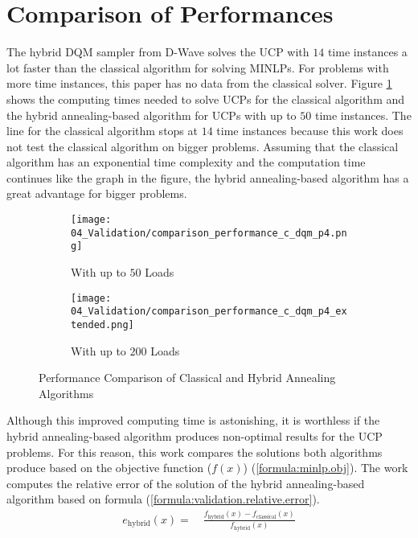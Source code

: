 \section{Comparison of Performances}
\label{evaluation:comparison}

The hybrid DQM sampler from D-Wave solves the UCP with $14$ time instances a lot faster than the classical algorithm for solving MINLPs.
For problems with more time instances, this paper has no data from the classical solver.
Figure \ref{figure:evaluation.comparison.performance} shows the computing times needed to solve UCPs for the classical algorithm and the hybrid annealing-based algorithm for UCPs with up to $50$ time instances.
The line for the classical algorithm stops at $14$ time instances because this work does not test the classical algorithm on bigger problems.
Assuming that the classical algorithm has an exponential time complexity and the computation time continues like the graph in the figure, the hybrid annealing-based algorithm has a great advantage for bigger problems.

\begin{figure}
  \begin{subfigure}[b]{0.5 \textwidth}
    \centering
    \texttt{[image: 04\_Validation/comparison\_performance\_c\_dqm\_p4.png]}
    \caption{With up to $50$ Loads}
    \label{figure:evaluation.comparison.performance}
  \end{subfigure}
  \begin{subfigure}[b]{0.5 \textwidth}
    \centering
    \texttt{[image: 04\_Validation/comparison\_performance\_c\_dqm\_p4\_extended.png]}
    \caption{With up to $200$ Loads}
    \label{figure:evaluation.comparison.performance.extended}
  \end{subfigure}
  \caption{Performance Comparison of Classical and Hybrid Annealing Algorithms}
\end{figure}

Although this improved computing time is astonishing, it is worthless if the hybrid annealing-based algorithm produces non-optimal results for the UCP problems.
For this reason, this work compares the solutions both algorithms produce based on the objective function ($f(x)$) (\ref{formula:minlp.obj}).
The work computes the relative error of the solution of the hybrid annealing-based algorithm based on formula (\ref{formula:validation.relative.error}).
\begin{align}
  \label{formula:validation.relative.error}
  e_{\text{hybrid}}(x) = \quad \frac{f_{\text{hybrid}}(x) - f_{\text{classical}}(x)}{f_{\text{hybrid}}(x)}
\end{align}


